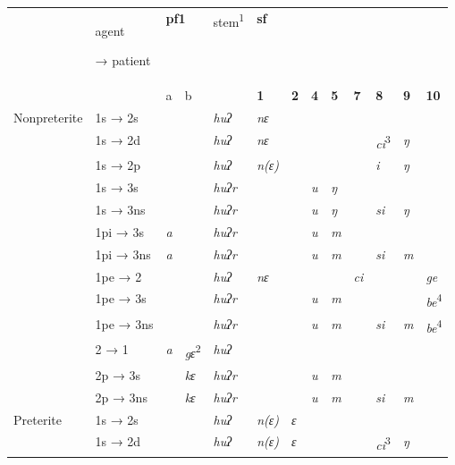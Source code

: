 \begin{table}[ht]
\begin{tabularx}{\textwidth}{XXXXXXXXXXXXX} & agent \par
\lsptoprule
 → patient & \multicolumn{2}{X}{\bfseries pf1} & stem\textsuperscript{1} & \multicolumn{8}{X}{\bfseries sf}\\
\hhline{~---~--------} &  & a & b &  & \bfseries 1 & \bfseries 2 & \bfseries 4 & \bfseries 5 & \bfseries 7 & \bfseries 8 & \bfseries 9 & \bfseries 10\\
 Nonpreterite & 1s → 2s &  &  & \itshape huʔ & \itshape nɛ &  &  &  &  &  &  & \\
& 1s → 2d &  &  & \itshape huʔ & \itshape nɛ &  &  &  &  & \textit{ci}\textsuperscript{3} & \itshape ŋ & \\
& 1s → 2p &  &  & \itshape huʔ & \itshape n(ɛ) &  &  &  &  & \itshape i & \itshape ŋ & \\
& 1s → 3s &  &  & \itshape huʔr &  &  & \itshape u & \itshape ŋ &  &  &  & \\
& 1s → 3ns &  &  & \itshape huʔr &  &  & \itshape u & \itshape ŋ &  & \itshape si & \itshape ŋ & \\
\hhline{~------------} & 1pi → 3s & \itshape a &  & \itshape huʔr &  &  & \itshape u & \itshape m &  &  &  & \\
& 1pi → 3ns & \itshape a &  & \itshape huʔr &  &  & \itshape u & \itshape m &  & \itshape si & \itshape m & \\
\hhline{~------------} & 1pe → 2 &  &  & \itshape huʔ & \itshape nɛ &  &  &  & \itshape ci &  &  & \itshape ge\\
& 1pe → 3s &  &  & \itshape huʔr &  &  & \itshape u & \itshape m &  &  &  & \textit{be}\textsuperscript{4}\\
& 1pe → 3ns &  &  & \itshape huʔr &  &  & \itshape u & \itshape m &  & \itshape si & \itshape m & \textit{be}\textsuperscript{4}\\
\hhline{~------------} & 2 → 1 & \itshape a & \textit{gɛ}\textsuperscript{2} & \itshape huʔ &  &  &  &  &  &  &  & \\
& 2p → 3s &  & \itshape kɛ & \itshape huʔr &  &  & \itshape u & \itshape m &  &  &  & \\
& 2p → 3ns &  & \itshape kɛ & \itshape huʔr &  &  & \itshape u & \itshape m &  & \itshape si & \itshape m & \\
 Preterite & 1s → 2s &  &  & \itshape huʔ & \itshape n(ɛ) & \itshape ɛ &  &  &  &  &  & \\
& 1s → 2d &  &  & \itshape huʔ & \itshape n(ɛ) & \itshape ɛ &  &  &  & \textit{ci}\textsuperscript{3} & \itshape ŋ & \\

\end{tabularx}
\end{table}
